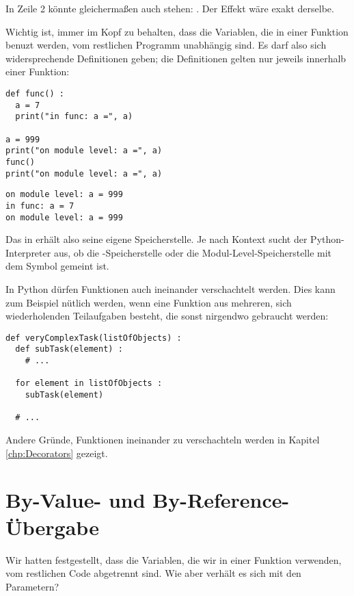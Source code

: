 In Zeile 2 könnte gleichermaßen auch stehen: . Der Effekt wäre exakt derselbe.

Wichtig ist, immer im Kopf zu behalten, dass die Variablen, die in einer Funktion benuzt werden, vom restlichen Programm unabhängig sind. Es darf also sich widersprechende Definitionen geben; die Definitionen gelten nur jeweils innerhalb einer Funktion:

\begin{codebox}
\begin{verbatim}
def func() :
  a = 7
  print("in func: a =", a)

a = 999
print("on module level: a =", a)
func()
print("on module level: a =", a)
\end{verbatim}
\end{codebox}

\begin{cmdbox}
\begin{verbatim}
on module level: a = 999
in func: a = 7
on module level: a = 999
\end{verbatim}
\end{cmdbox}

Das  in  erhält also seine eigene Speicherstelle. Je nach Kontext sucht der Python-Interpreter aus, ob die -Speicherstelle oder die Modul-Level-Speicherstelle mit dem Symbol  gemeint ist.

In Python dürfen Funktionen auch ineinander verschachtelt werden. Dies kann zum Beispiel nütlich werden, wenn eine Funktion aus mehreren, sich wiederholenden Teilaufgaben besteht, die sonst nirgendwo gebraucht werden:

\begin{codebox}
\begin{verbatim}
def veryComplexTask(listOfObjects) :
  def subTask(element) :
    # ...
    
  for element in listOfObjects :
    subTask(element)
  
  # ...
\end{verbatim}
\end{codebox}

Andere Gründe, Funktionen ineinander zu verschachteln werden in Kapitel \ref{chp:Decorators} gezeigt.

\section{By-Value- und By-Reference-Übergabe}
Wir hatten festgestellt, dass die Variablen, die wir in einer Funktion verwenden, vom restlichen Code abgetrennt sind. Wie aber verhält es sich mit den Parametern?

